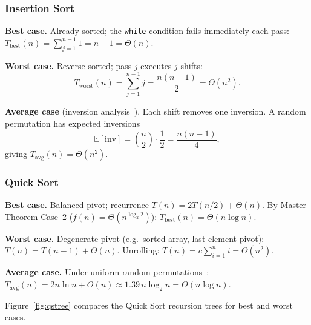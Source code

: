 \documentclass[11pt,a4paper]{article}
\begin{document}
\subsubsection*{Insertion Sort}
\textbf{Best case.} Already sorted; the \texttt{while} condition fails
immediately each pass:
$T_{\text{best}}(n)=\sum_{j=1}^{n-1}1=n-1=\Theta(n)$.

\textbf{Worst case.} Reverse sorted; pass $j$ executes $j$ shifts:
\begin{equation}
T_{\text{worst}}(n)=\sum_{j=1}^{n-1}j=\frac{n(n-1)}{2}=\Theta(n^2).
\end{equation}

\textbf{Average case} (inversion analysis~\cite{knuth1998}). Each shift removes
one inversion. A random permutation has expected inversions
\begin{equation}
\mathbb{E}[\text{inv}]
  = \binom{n}{2}\cdot\frac{1}{2} = \frac{n(n-1)}{4},
\end{equation}
giving $T_{\text{avg}}(n)=\Theta(n^2)$.

\subsubsection*{Quick Sort}
\textbf{Best case.} Balanced pivot; recurrence
$T(n)=2T(n/2)+\Theta(n)$.
By Master Theorem Case~2 ($f(n)=\Theta(n^{\log_2 2})$):
$T_{\text{best}}(n)=\Theta(n\log n)$.

\textbf{Worst case.} Degenerate pivot (e.g.\ sorted array, last-element pivot):
$T(n)=T(n-1)+\Theta(n)$.
Unrolling: $T(n)=c\sum_{i=1}^{n}i=\Theta(n^2)$.

\textbf{Average case.} Under uniform random permutations~\cite{cormen2022}:
$T_{\text{avg}}(n)=2n\ln n+O(n)\approx 1.39\,n\log_2 n=\Theta(n\log n)$.

Figure~\ref{fig:qstree} compares the Quick Sort recursion trees for best and
worst cases.
\end{document}
